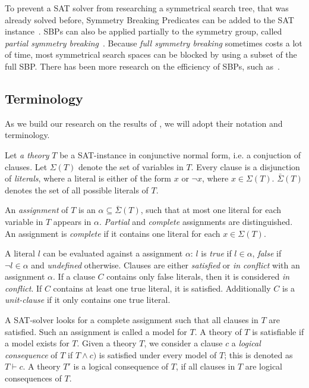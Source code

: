 To prevent a SAT solver from researching a symmetrical search tree, that was already solved
before, Symmetry Breaking Predicates can be added to the SAT
instance~\cite{sakallah2009symmetry}. SBPs can also be applied partially to the symmetry
group, called \textit{partial symmetry breaking}~\cite{sakallah2009symmetry}. Because
\textit{full symmetry breaking} sometimes costs a lot of time, most symmetrical search
spaces can be blocked by using a subset of the full SBP. There has been more research on
the efficiency of SBPs, such as~\cite{aloul2006efficient}.

\subsection{Terminology}
	As we build our research on the results of \cite{devriendt2012symmetry}, we will adopt
	their notation and terminology.

	Let \emph{a theory} $T$ be a SAT-instance in conjunctive normal form, i.e. a conjuction
	of clauses.
	Let $\Sigma(T)$ denote the set of variables in $T$.
	Every clause is a disjunction of \emph{literals}, where a literal is either of the form
	$x$ or $\neg x$, where $x \in \Sigma(T)$.
	$\bar\Sigma(T)$ denotes the set of all possible literals of $T$.

	An \emph{assignment} of $T$ is an $\alpha \subseteq \bar\Sigma(T)$, such that at most
	one literal for each variable in $T$ appears in $\alpha$.
	\emph{Partial} and \emph{complete} assignments are distinguished.
	An assignment is \emph{complete} if it contains one literal for each $x \in \Sigma(T)$.

	A literal $l$ can be evaluated against a assignment $\alpha$: $l$ is \emph{true} if $l \in
	\alpha$, \emph{false} if $\neg l \in \alpha$ and \emph{undefined} otherwise.
	Clauses are either \emph{satisfied} or \emph{in conflict} with an assignment $\alpha$.
	If a clause $C$ contains only false literals, then it is considered \emph{in conflict}.
	If $C$ contains at least one true literal, it is satisfied.
	Additionally $C$ is a \emph{unit-clause} if it only contains one true literal.

	A SAT-solver looks for a complete assignment such that all clauses in $T$ are satisfied.
	Such an assignment is called a model for $T$.
	A theory of $T$ is satisfiable if a model exists for $T$.
	Given a theory $T$, we consider a clause $c$ a \emph{logical consequence} of $T$ if
	$T \wedge c)$ is satisfied under every model of $T$; this is denoted as $T \vdash c$.
	A theory $T'$ is a logical consequence of $T$, if all clauses in $T$ are logical
	consequences of $T$.

